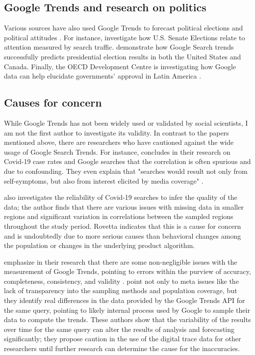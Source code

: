 \subsection{Google Trends and research on politics}

Various sources have also used Google Trends to forecast
political elections and political attitudes
\citep{wolfTrendingRightDirection2018}. For instance,
\citet{swearingenGoogleInsightsSenate2014} investigate how U.S. Senate
Elections relate to attention measured by search traffic.
\citet{prado-romanGoogleTrendsPredictor2020} demonstrate how Google Search trends
successfully predicts presidential election results in both the United
States and Canada. Finally, the OECD Development Centre is investigating
how Google data can help elucidate governments' approval in Latin
America \citep{montoyaUsingGoogleData2020}. 

\subsection{Causes for concern}

While Google Trends has not been widely used or validated by social scientists,
I am not the first author to investigate its validity.
In contrast to the papers mentioned above, there are researchers who have cautioned against
the wide usage of Google Search Trends. For instance, \citet{asseoTrackingCOVID19Using2020} 
concludes in their research on Covid-19 case rates and Google searches that the correlation 
is often spurious and due to confounding. They even explain that "searches would
result not only from self-symptoms, but also from interest elicited by
media coverage" \citep[][p.1]{asseoTrackingCOVID19Using2020}.

\citet{rovetta21} also investigates the reliability of Covid-19 searches to infer 
the quality of the data; the author finds that there are various issues with missing data in 
smaller regions and significant variation in correlations between the sampled regions throughout
the study period. Rovetta indicates that this is a cause for concern and is undoubtedly due to more 
serious causes than behavioral changes among the population or changes in the underlying product algorithm. 

\citet{cebrian_domenech22} emphasize in their research that there are some 
non-negligible issues with the measurement of Google Trends, pointing to 
errors within the purview of accuracy, completeness, consistency, and validity \citep{KarrDataQuality}. \citet{cebrian_domenech22} point not only to 
meta issues like the lack of transparency into the sampling methods 
and population coverage, but they identify real differences 
in the data provided by the Google Trends API for the same query, pointing
to likely internal process used by Google to sample their data to compute the trends.
These authors show that the variability of the results over time for the same query
can alter the results of analysis and forecasting significantly; they propose
caution in the use of the digital trace data for other researchers until
further research can determine the cause for the inaccuracies. 

